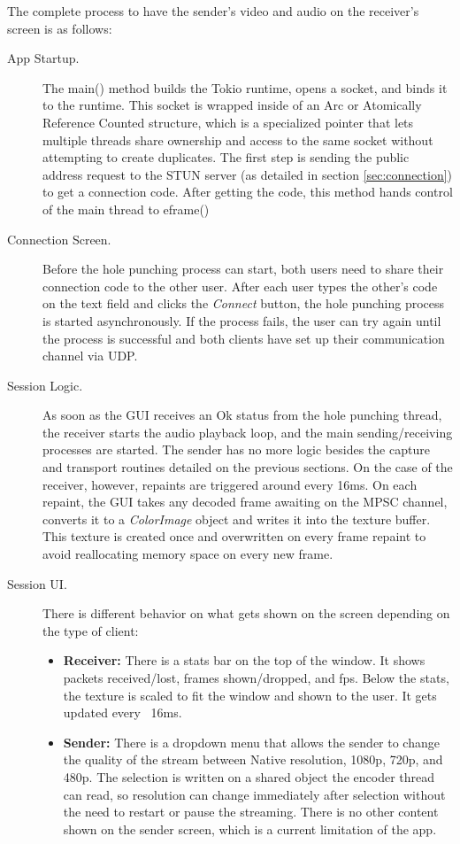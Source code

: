 \documentclass{article}
\begin{document}
The complete process to have the sender's video and audio on the receiver's screen is as follows:
\begin{description}
    \item[App Startup.] The \colorbox{gray!10}{main()} method builds the Tokio runtime, opens a socket, and binds it to the runtime. This socket is wrapped inside of an Arc or Atomically Reference Counted structure, which is a specialized pointer that lets multiple threads share ownership and access to the same socket without attempting to create duplicates. The first step is sending the public address request to the STUN server (as detailed in section \ref{sec:connection}) to get a connection code. After getting the code, this method hands 
    control of the main thread to \colorbox{gray!20}{eframe()}
    \item[Connection Screen.] Before the hole punching process can start, both users need to share their connection code to the other user. After each user types the other's code on the text field and clicks the \textit{Connect} button, the hole punching process is started asynchronously. If the process fails, the user can try again until the process is successful and both clients have set up their communication channel via UDP.
    \item[Session Logic.] As soon as the GUI receives an Ok status from the hole punching thread, the receiver starts the audio playback loop, and the main sending/receiving processes are started. The sender has no more logic besides the capture and transport routines detailed on the previous sections. On the case of the receiver, however, repaints are triggered around every 16ms. On each repaint, the GUI takes any decoded frame awaiting on the MPSC channel, converts it to a \textit{ColorImage} object and writes it into the texture buffer. This texture is created once and
    overwritten on every frame repaint to avoid reallocating memory space on every new frame. 
    \item[Session UI.] There is different behavior on what gets shown on the screen depending on the type of client:
    \begin{itemize}
        \item \textbf{Receiver:} There is a stats bar on the top of the window. It shows packets received/lost, frames shown/dropped, and fps. Below the stats, the texture is scaled to fit the window and shown to the user. It gets updated every ~16ms.
        \item \textbf{Sender:} There is a dropdown menu that allows the sender to change the quality of the stream between Native resolution, 1080p, 720p, and 480p. The selection is written on a shared object the encoder thread can read, so resolution can change immediately after selection without the need to restart or pause the streaming. There is no other content shown on the sender screen, which is a current limitation of the app.
    \end{itemize}
\end{description}
\end{document}
